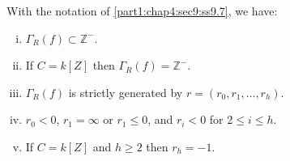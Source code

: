 \setcounter{thm}{7}
\begin{lemma}\label{part1:chap4:sec9:lem9.8}
  With the notation of \ref{part1:chap4:sec9:ss9.7}, we have:
\begin{enumerate}[(i)]
\item $\Gamma_R (f) \subset \mathbb{Z}^-$.
\item If $C= k[Z]$ then $\Gamma_R (f)=\mathbb{Z}^-$.
\item $\Gamma_R(f)$ is strictly generated by $r= (r_0, r_1, \ldots, r_h)$.
\item $r_0 < 0$, $r_1= \infty$ or $r_1\leq 0$, and $r_i < 0$ for $2 \leq i \leq h$.
\item If $C= k[Z]$ and $h \geq 2$ then $r_h=-1$.
\end{enumerate}
\end{lemma}

